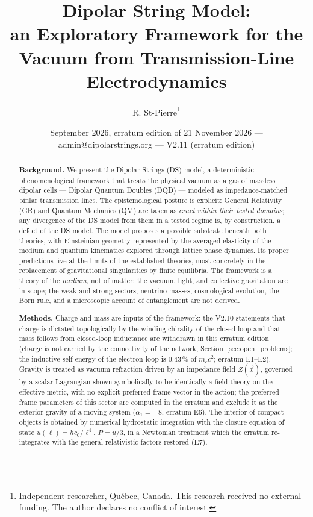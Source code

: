 \documentclass[11pt,a4paper]{article}
\title{\textbf{Dipolar String Model:}\\ \large an Exploratory Framework for the Vacuum from Transmission-Line Electrodynamics}
\author{R. St-Pierre\thanks{Independent researcher, Qu\'ebec, Canada. This research received no external funding. The author declares no conflict of interest.}}
\date{September 2026, erratum edition of 21 November 2026 --- admin@dipolarstrings.org --- V2.11 (erratum edition)}
\theoremstyle{plain}
\theoremstyle{remark}
\begin{document}
\maketitle

\begin{abstract}
\noindent\textbf{Background.} We present the Dipolar Strings (DS) model, a deterministic phenomenological framework that treats the physical vacuum as a gas of massless dipolar cells --- Dipolar Quantum Doubles (DQD) --- modeled as impedance-matched bifilar transmission lines. The epistemological posture is explicit: General Relativity (GR) and Quantum Mechanics (QM) are taken as \emph{exact within their tested domains}; any divergence of the DS model from them in a tested regime is, by construction, a defect of the DS model. The model proposes a possible substrate beneath both theories, with Einsteinian geometry represented by the averaged elasticity of the medium and quantum kinematics explored through lattice phase dynamics. Its proper predictions live at the limits of the established theories, most concretely in the replacement of gravitational singularities by finite equilibria. The framework is a theory of the \emph{medium}, not of matter: the vacuum, light, and collective gravitation are in scope; the weak and strong sectors, neutrino masses, cosmological evolution, the Born rule, and a microscopic account of entanglement are not derived.

\noindent\textbf{Methods.} Charge and mass are inputs of the framework: the V2.10 statements that charge is dictated topologically by the winding chirality of the closed loop and that mass follows from closed-loop inductance are withdrawn in this erratum edition (charge is not carried by the connectivity of the network, Section~\ref{sec:open_problems}; the inductive self-energy of the electron loop is $0.43\,\%$ of $m_e c^2$; erratum E1--E2). Gravity is treated as vacuum refraction driven by an impedance field $Z(\vec{x})$, governed by a scalar Lagrangian shown symbolically to be identically a field theory on the effective metric, with no explicit preferred-frame vector in the action; the preferred-frame parameters of this sector are computed in the erratum and exclude it as the exterior gravity of a moving system ($\alpha_1 = -8$, erratum E6). The interior of compact objects is obtained by numerical hydrostatic integration with the closure equation of state $u(\ell) = hc_0/\ell^4$, $P = u/3$, in a Newtonian treatment which the erratum re-integrates with the general-relativistic factors restored (E7).


\end{abstract}
\end{document}
